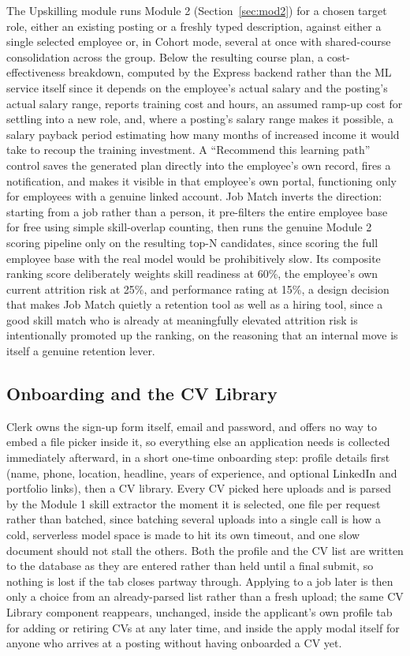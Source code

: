 \documentclass[11pt,a4paper]{article}
\begin{document}
The Upskilling module runs Module 2 (Section~\ref{sec:mod2}) for a chosen target role, either an existing posting or a freshly typed description, against either a single selected employee or, in Cohort mode, several at once with shared-course consolidation across the group. Below the resulting course plan, a cost-effectiveness breakdown, computed by the Express backend rather than the ML service itself since it depends on the employee's actual salary and the posting's actual salary range, reports training cost and hours, an assumed ramp-up cost for settling into a new role, and, where a posting's salary range makes it possible, a salary payback period estimating how many months of increased income it would take to recoup the training investment. A ``Recommend this learning path'' control saves the generated plan directly into the employee's own record, fires a notification, and makes it visible in that employee's own portal, functioning only for employees with a genuine linked account. Job Match inverts the direction: starting from a job rather than a person, it pre-filters the entire employee base for free using simple skill-overlap counting, then runs the genuine Module 2 scoring pipeline only on the resulting top-N candidates, since scoring the full employee base with the real model would be prohibitively slow. Its composite ranking score deliberately weights skill readiness at 60\%, the employee's own current attrition risk at 25\%, and performance rating at 15\%, a design decision that makes Job Match quietly a retention tool as well as a hiring tool, since a good skill match who is already at meaningfully elevated attrition risk is intentionally promoted up the ranking, on the reasoning that an internal move is itself a genuine retention lever.

\subsection{Onboarding and the CV Library}

Clerk owns the sign-up form itself, email and password, and offers no way to embed a file picker inside it, so everything else an application needs is collected immediately afterward, in a short one-time onboarding step: profile details first (name, phone, location, headline, years of experience, and optional LinkedIn and portfolio links), then a CV library. Every CV picked here uploads and is parsed by the Module 1 skill extractor the moment it is selected, one file per request rather than batched, since batching several uploads into a single call is how a cold, serverless model space is made to hit its own timeout, and one slow document should not stall the others. Both the profile and the CV list are written to the database as they are entered rather than held until a final submit, so nothing is lost if the tab closes partway through. Applying to a job later is then only a choice from an already-parsed list rather than a fresh upload; the same CV Library component reappears, unchanged, inside the applicant's own profile tab for adding or retiring CVs at any later time, and inside the apply modal itself for anyone who arrives at a posting without having onboarded a CV yet.
\end{document}
